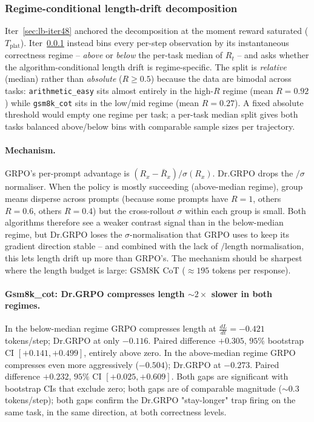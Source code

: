 \documentclass{article}
\newcommand{\tplat}{T_{\text{plat}}}
\begin{document}
\subsubsection{Regime-conditional length-drift decomposition}\label{sec:lb-iter52}

Iter~\ref{sec:lb-iter48} anchored the decomposition at the moment reward
saturated ($\tplat$). Iter~\ref{sec:lb-iter52} instead bins every per-step
observation by its instantaneous correctness regime -- \emph{above} or
\emph{below} the per-task median of $R_t$ -- and asks whether the
algorithm-conditional length drift is regime-specific. The split is
\emph{relative} (median) rather than \emph{absolute} ($R \geq 0.5$)
because the data are bimodal across tasks: \texttt{arithmetic\_easy} sits
almost entirely in the high-$R$ regime (mean $R = 0.92$) while
\texttt{gsm8k\_cot} sits in the low/mid regime (mean $R = 0.27$). A
fixed absolute threshold would empty one regime per task; a per-task
median split gives both tasks balanced above/below bins with comparable
sample sizes per trajectory.

\paragraph{Mechanism.}
GRPO's per-prompt advantage is $(R_x - \bar{R}_x) / \sigma(R_x)$.
Dr.GRPO drops the $/ \sigma$ normaliser. When the policy is mostly
succeeding (above-median regime), group means disperse across prompts
(because some prompts have $R=1$, others $R=0.6$, others $R=0.4$) but
the cross-rollout $\sigma$ within each group is small. Both algorithms
therefore see a weaker contrast signal than in the below-median regime,
but Dr.GRPO loses the $\sigma$-normalisation that GRPO uses to keep
its gradient direction stable -- and combined with the lack of
$/ \text{length}$ normalisation, this lets length drift up more than
GRPO's. The mechanism should be sharpest where the length budget is
large: GSM8K CoT ($\approx 195$ tokens per response).

\paragraph{Gsm8k\_cot: Dr.GRPO compresses length $\sim 2\times$ slower in both regimes.}
In the below-median regime GRPO compresses length at
$\tfrac{dL}{dt} = -0.421$ tokens/step; Dr.GRPO at only $-0.116$. Paired
difference $+0.305$, $95\%$ bootstrap CI $[+0.141, +0.499]$, entirely
above zero. In the above-median regime GRPO compresses even more
aggressively ($-0.504$); Dr.GRPO at $-0.273$. Paired difference $+0.232$,
$95\%$ CI $[+0.025, +0.609]$. Both gaps are significant with
bootstrap CIs that exclude zero; both gaps are of comparable magnitude
($\sim 0.3$ tokens/step); both gaps confirm the Dr.GRPO "stay-longer"
trap firing on the same task, in the same direction, at both
correctness levels.
\end{document}
